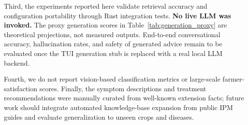 Third, the experiments reported here validate retrieval accuracy and configuration portability through Rust integration tests. \textbf{No live LLM was invoked.} The proxy generation scores in Table~\ref{tab:generation_proxy} are theoretical projections, not measured outputs. End-to-end conversational accuracy, hallucination rates, and safety of generated advice remain to be evaluated once the TUI generation stub is replaced with a real local LLM backend.

Fourth, we do not report vision-based classification metrics or large-scale farmer-satisfaction scores. Finally, the symptom descriptions and treatment recommendations were manually curated from well-known extension facts; future work should integrate automated knowledge-base expansion from public IPM guides and evaluate generalization to unseen crops and diseases.
